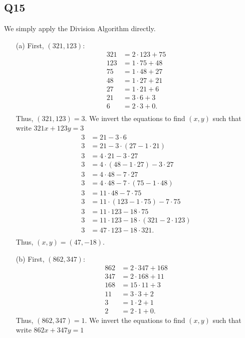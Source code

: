 \documentclass[12pt]{article}
\numberwithin{theorem}{section}
\numberwithin{equation}{section}
\numberwithin{remark}{section}
\numberwithin{definition}{section}
\numberwithin{theorem}{section}
\numberwithin{lemma}{section}
\numberwithin{example}{section}
\begin{document}
\subsection{Q15}

We simply apply the Division Algorithm directly. 
\begin{itemize}
	\item[(a)]{First, $(321,123)$:
		\begin{align*}
			321 & = 2\cdot123 + 75\\
			123 & = 1\cdot75 + 48\\
			75 & = 1\cdot48 + 27\\
			48 & = 1\cdot27 + 21\\
			27 & = 1\cdot21 + 6\\
			21 & = 3\cdot6 + 3\\
			6 & = 2\cdot3 + 0.\\
		\end{align*}
	Thus, $(321,123)=3$. We invert the equations to find $(x,y)$ such that write $321x+123y=3$
	\begin{align*}
		3 & = 21 - 3\cdot6\\
		3 & = 21 - 3\cdot(27-1\cdot21)\\
		3 & = 4\cdot 21 - 3\cdot27\\
		3 & = 4\cdot (48-1\cdot27) - 3\cdot27\\
		3 & = 4\cdot 48 - 7\cdot27\\
		3 & = 4\cdot 48 - 7\cdot(75 - 1\cdot48 )\\
		3 & = 11\cdot 48 - 7\cdot 75\\
		3 & = 11\cdot (123-1\cdot75) - 7\cdot 75\\
		3 & = 11\cdot 123 - 18\cdot 75\\
		3 & = 11\cdot 123 - 18\cdot (321-2\cdot123)\\
		3 & = 47\cdot 123 - 18\cdot 321.\\
	\end{align*}
	Thus, $(x,y)=(47,-18)$.}
	\item[(b)]{First, $(862,347)$:
	\begin{align*}
		862 & = 2\cdot347 + 168\\
		347 & = 2\cdot168 + 11\\
		168 & = 15\cdot11 + 3\\
		11 & = 3\cdot3 + 2\\
		3 & = 1\cdot2 + 1\\
		2 &= 2\cdot1 + 0.
	\end{align*}
	Thus, $(862,347)=1$. We invert the equations to find $(x,y)$ such that write $862x+347y=1$
}
\end{itemize}
\end{document}
